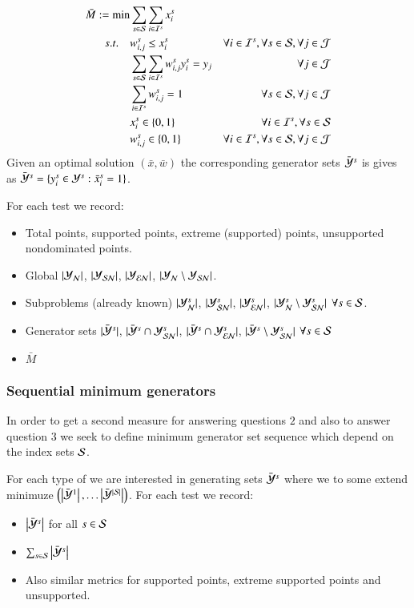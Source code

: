 \begin{enumerate}
\begin{align*}
	\bar{M}  := \min&  \sum_{s \in \S}\sum_{i \in \I^s} x^s_i \\
	s.t. \quad & w^s_{i,j} \le x^s_i & \forall i \in \I^s, \forall s \in \S, \forall j \in \J \\
		   &\sum_{s \in \S}\sum_{i \in \I^s} w^s_{i,j} y^s_i = y_j & \quad \forall j \in \J \\
		   &\sum_{i \in \I^s} w^s_{i,j} = 1 & \quad \forall s \in \S, \forall j \in \J  \\
		   & x^s_i \in \{0,1\} & \forall i \in \I^s, \forall s \in \S\\
		   & w^s_{i,j} \in \{0,1\} &\forall i \in \I^s, \forall s \in \S, \forall j \in \J \nonumber
\end{align*}
Given an optimal solution $(\bar{x},\bar{w})$ the corresponding generator sets $\Ycs$ is gives as $\Ycs = \{ y^s_i \in \Y^s : \bar{x}^s_i = 1\}$.

For each test we record:
\begin{itemize}
	\item Total points, supported points, extreme (supported) points, unsupported nondominated points.
	\item Global $\lvert \Yn \rvert$, $\lvert \Ysn \rvert$,  $\lvert \Yen \rvert$, $\lvert \Yn \setminus \Ysn \rvert$.
	\item Subproblems (already known)  $\lvert \Yn^s \rvert$, $\lvert \Ysn^s \rvert$,  $\lvert \Yen^s \rvert$, $\lvert \Yn^s \setminus \Ysn^s \rvert$ $\forall s \in \S$.
	\item Generator sets $\lvert \Ycs \rvert$, $\lvert \Ycs \cap \Ysn^s \rvert$, $\lvert \Ycs \cap \Yen^s \rvert$,  $\lvert \Ycs \setminus \Ysn^s \rvert$  $\forall s \in \S$
	\item $\bar{M}$
\end{itemize}





\subsubsection{Sequential minimum generators}
In order to get a second measure for answering questions $2$ and also to answer question $3$ we seek to define minimum generator set sequence which depend on the index sets $\S$.

For each type of we are interested in generating sets $\bY^s$ where we to some extend minimuze $ \left(\abs{\bY^1}, \hdots \abs{\bY^{\abs{\S}}}\right) $. For each test we record:
\begin{itemize}
	\item $\abs{\bY^s}$ for all $s \in \S$
	\item $\sum_{s \in \S} \abs{\bY^s} $
	\item Also similar metrics for supported points, extreme supported points and unsupported.
\end{itemize}



\end{enumerate}
